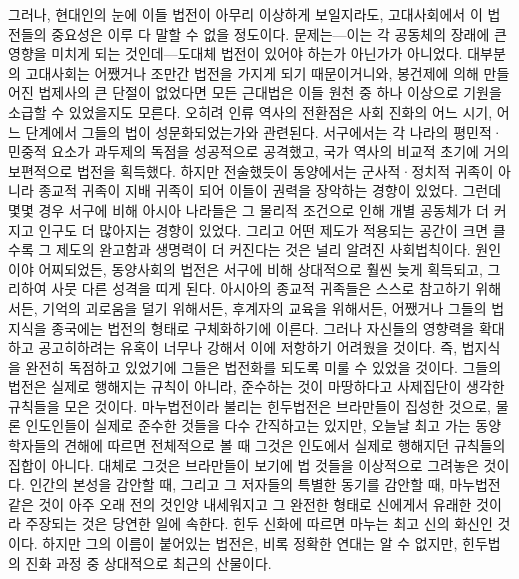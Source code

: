그러나, 현대인의 눈에 이들 법전이 아무리 이상하게 보일지라도,
고대사회에서 이 법전들의 중요성은 이루 다 말할 수 없을 정도이다.
문제는---이는 각 공동체의 장래에 큰 영향을 미치게 되는 것인데---도대체
법전이 있어야 하는가 아닌가가 아니었다.
대부분의 고대사회는 어쨌거나 조만간 법전을 가지게 되기 때문이거니와,
봉건제에 의해 만들어진 법제사의 큰 단절이 없었다면
모든 근대법은 이들 원천 중 하나 이상으로
기원을 소급할 수 있었을지도 모른다.
오히려 인류 역사의 전환점은
사회 진화의 어느 시기, 어느 단계에서 그들의 법이 성문화되었는가와 관련된다.
서구에서는 각 나라의 평민적^^b7민중적 요소가 과두제의 독점을 성공적으로
공격했고, 국가 역사의 비교적 초기에 거의 보편적으로 법전을 획득했다.
하지만 전술했듯이 동양에서는 군사적^^b7정치적 귀족이 아니라
종교적 귀족이 지배 귀족이 되어 이들이 권력을 장악하는 경향이 있었다.
그런데 몇몇 경우 서구에 비해 아시아 나라들은 그 물리적 조건으로 인해
개별 공동체가 더 커지고 인구도 더 많아지는 경향이 있었다.
그리고 어떤 제도가 적용되는 공간이 크면 클수록
그 제도의 완고함과 생명력이 더 커진다는 것은 널리 알려진 사회법칙이다.
원인이야 어찌되었든, 동양사회의 법전은 서구에 비해
상대적으로 훨씬 늦게 획득되고, 그리하여 사뭇 다른 성격을 띠게 된다.
아시아의 종교적 귀족들은 스스로 참고하기 위해서든, 기억의 괴로움을
덜기 위해서든, 후계자의 교육을 위해서든, 어쨌거나
그들의 법지식을 종국에는 법전의 형태로 구체화하기에 이른다.
그러나 자신들의 영향력을 확대하고 공고히하려는 유혹이 너무나 강해서
이에 저항하기 어려웠을 것이다. 즉,
법지식을 완전히 독점하고 있었기에 그들은
법전화를 되도록 미룰 수 있었을 것이다.
그들의 법전은 실제로 행해지는 규칙이 아니라,
준수하는 것이 마땅하다고 사제집단이 생각한 규칙들을 모은 것이다.
마누법전이라 불리는 힌두법전은 브라만들이 집성한 것으로,
물론 인도인들이 실제로 준수한 것들을 다수 간직하고는 있지만,
오늘날 최고 가는 동양학자들의 견해에 따르면
전체적으로 볼 때 그것은 인도에서 실제로 행해지던 규칙들의 집합이 아니다.
대체로 그것은 브라만들이 보기에 법 것들을
이상적으로 그려놓은 것이다.
인간의 본성을 감안할 때, 그리고 그 저자들의 특별한 동기를 감안할 때,
마누법전 같은 것이 아주 오래 전의 것인양 내세워지고
그 완전한 형태로 신에게서 유래한 것이라 주장되는 것은 당연한 일에 속한다.
힌두 신화에 따르면 마누는 최고 신의 화신인 것이다.
하지만 그의 이름이 붙어있는 법전은, 비록 정확한 연대는 알 수 없지만,
힌두법의 진화 과정 중 상대적으로 최근의 산물이다.

